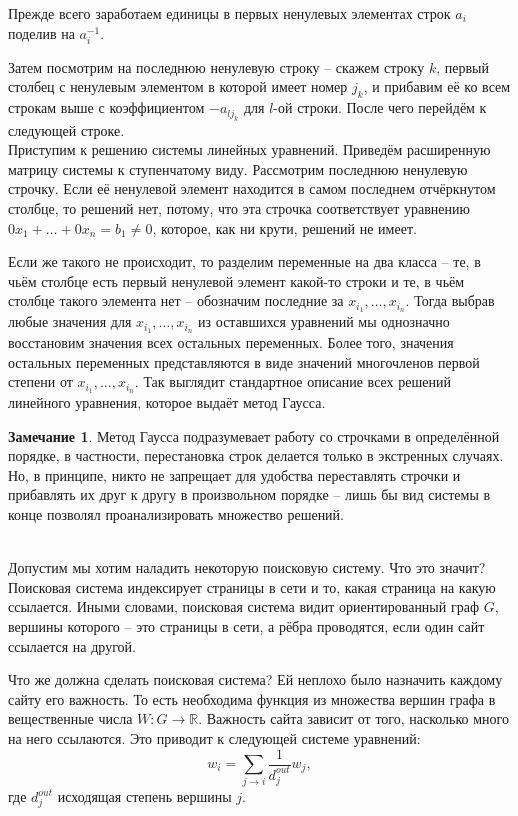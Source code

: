 \documentclass[10pt,a4paper,oneside]{book}
\theoremstyle{definition}
\newtheorem*{rem}{Замечание}
\newcommand{\mb}[1]{\mathbb{#1}}
\def\exm{\noindent {\bf Примеры:}}
\def\rm{\begin{rem}}
\def\erm{\end{rem}}
\begin{document}
Прежде всего заработаем единицы в первых ненулевых элементах строк $a_i$ поделив на $a_i^{-1}$.

Затем посмотрим на последнюю ненулевую строку -- скажем строку $k$, первый  столбец с ненулевым элементом в которой имеет номер $j_k$, и прибавим её ко всем строкам выше с коэффициентом $-a_{lj_k}$ для $l$-ой строки. После чего перейдём к следующей строке.\\



Приступим к решению системы линейных уравнений. Приведём расширенную матрицу системы к ступенчатому виду. Рассмотрим последнюю ненулевую строчку. Если её ненулевой элемент находится в самом последнем отчёркнутом столбце, то решений нет, потому, что эта строчка соответствует уравнению $0x_1+\dots+0x_n=b_1\neq 0$, которое, как ни крути, решений не имеет.

Если же такого не происходит, то разделим переменные на два класса -- те, в чьём столбце есть первый ненулевой элемент какой-то строки и те, в чьём столбце такого элемента нет -- обозначим последние за $x_{i_1},\dots,x_{i_n}$. Тогда выбрав любые значения для $x_{i_1},\dots,x_{i_n}$ из оставшихся уравнений мы однозначно восстановим значения всех остальных переменных. Более того, значения остальных переменных представляются в виде значений многочленов первой степени от  $x_{i_1},\dots,x_{i_n}$. Так выглядит стандартное описание всех решений линейного уравнения, которое выдаёт метод Гаусса.

\rm Метод Гаусса подразумевает работу со строчками в определённой порядке, в частности, перестановка строк делается только в экстренных случаях. Но, в принципе, никто не запрещает для удобства переставлять строчки и прибавлять их друг к другу в произвольном порядке -- лишь бы вид системы в конце позволял проанализировать множество решений.
\erm

\exm\\
Допустим мы хотим наладить некоторую поисковую систему. Что это значит? Поисковая система индексирует страницы в сети и то, какая страница на какую ссылается. Иными словами, поисковая система видит ориентированный граф $G$, вершины которого -- это страницы в сети, а рёбра проводятся, если один сайт ссылается на другой.

Что же должна сделать поисковая система? Ей неплохо было назначить каждому сайту его важность. То есть необходима функция из множества вершин графа в вещественные числа  $W\colon G \to \mb R$. Важность сайта зависит от того, насколько много на него ссылаются. Это приводит  к следующей системе уравнений:
$$w_i=\sum_{j\to i} \frac{1}{d_j^{out}}w_j,$$
где $d_j^{out}$ исходящая степень вершины $j$.
\end{document}
